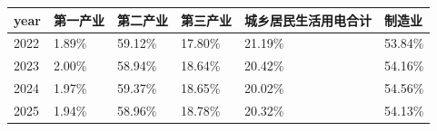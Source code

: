 \begin{tabular}{llllll}
\toprule
year & 第一产业 & 第二产业 & 第三产业 & 城乡居民生活用电合计 & 制造业 \\
\midrule
2022 & 1.89\% & 59.12\% & 17.80\% & 21.19\% & 53.84\% \\
2023 & 2.00\% & 58.94\% & 18.64\% & 20.42\% & 54.16\% \\
2024 & 1.97\% & 59.37\% & 18.65\% & 20.02\% & 54.56\% \\
2025 & 1.94\% & 58.96\% & 18.78\% & 20.32\% & 54.13\% \\
\bottomrule
\end{tabular}
